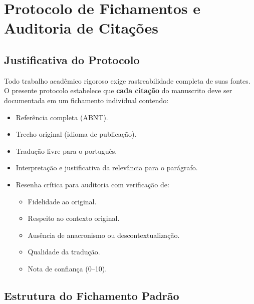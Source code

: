 \documentclass[12pt,a4paper]{article}
\begin{document}
\section{Protocolo de Fichamentos e Auditoria de Citações}

\subsection{Justificativa do Protocolo}

Todo trabalho acadêmico rigoroso exige rastreabilidade completa de suas fontes. O presente protocolo estabelece que \textbf{cada citação} do manuscrito deve ser documentada em um fichamento individual contendo:

\begin{itemize}
\item Referência completa (ABNT).
\item Trecho original (idioma de publicação).
\item Tradução livre para o português.
\item Interpretação e justificativa da relevância para o parágrafo.
\item Resenha crítica para auditoria com verificação de:
    \begin{itemize}
    \item Fidelidade ao original.
    \item Respeito ao contexto original.
    \item Ausência de anacronismo ou descontextualização.
    \item Qualidade da tradução.
    \item Nota de confiança (0--10).
    \end{itemize}
\end{itemize}

\subsection{Estrutura do Fichamento Padrão}
\end{document}
